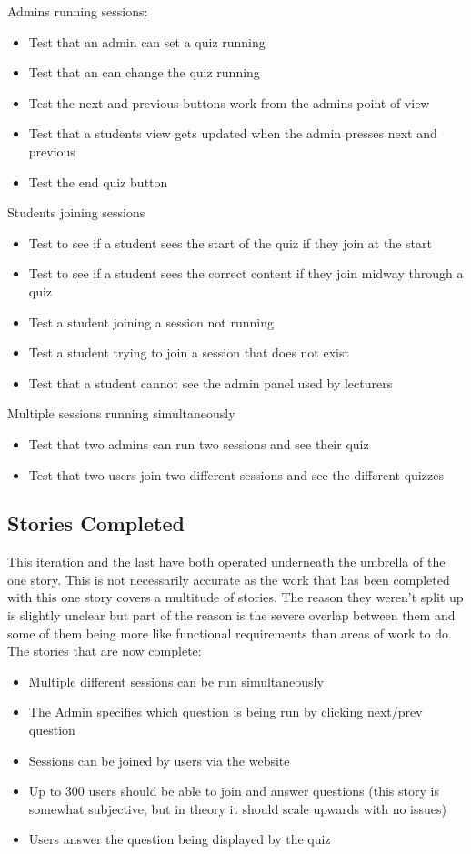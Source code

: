 Admins running sessions:
\begin{itemize}
	\item Test that an admin can set a quiz running
	\item Test that an can change the quiz running
	\item Test the next and previous buttons work from the admins point of view
	\item Test that a students view gets updated when the admin presses next and previous
	\item Test the end quiz button
\end{itemize}

Students joining sessions
\begin{itemize}
	\item Test to see if a student sees the start of the quiz if they join at the start
	\item Test to see if a student sees the correct content if they join midway through a quiz
	\item Test a student joining a session not running
	\item Test a student trying to join a session that does not exist
	\item Test that a student cannot see the admin panel used by lecturers
\end{itemize}

Multiple sessions running simultaneously
\begin{itemize}
	\item Test that two admins can run two sessions and see their quiz
	\item Test that two users join two different sessions and see the different quizzes
\end{itemize}
\newpage

\subsection{Stories Completed}
This iteration and the last have both operated underneath the umbrella of the one story. This is not necessarily accurate as the work that has been completed with this one story covers a multitude of stories. The reason they weren't split up is slightly unclear but part of the reason is the severe overlap between them and some of them being more like functional requirements than areas of work to do. The stories that are now complete:
\begin{itemize}
	\item Multiple different sessions can be run simultaneously
	\item The Admin specifies which question is being run by clicking next/prev question
	\item Sessions can be joined by users via the website
	\item Up to 300 users should be able to join and answer questions (this story is somewhat subjective, but in theory it should scale upwards with no issues)
	\item Users answer the question being displayed by the quiz
\end{itemize}
\newpage

